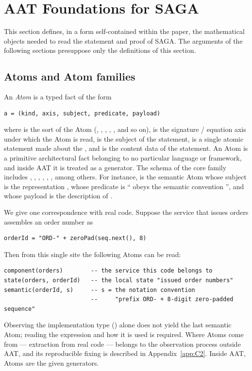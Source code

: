 \section{AAT Foundations for SAGA}\label{sec:3}

This section defines, in a form self-contained within the paper, the
mathematical objects needed to read the statement and proof of SAGA. The
arguments of the following sections presuppose only the definitions of
this section.

\subsection{Atoms and Atom families}\label{sec:31}

\begin{definition}[Atom]\label{def:atom}
An \emph{Atom} is a typed fact of the form
\begin{verbatim}
a = (kind, axis, subject, predicate, payload)
\end{verbatim}
where  is the sort of the Atom (,
, , , , and so
on),  is the signature / equation axis under which the Atom is
read,  is the subject of the statement,  is
a single atomic statement made about the , and
 is the content data of the statement. An Atom is a
primitive architectural fact belonging to no particular language or
framework, and inside AAT it is treated as a generator. The schema of the
core family includes , ,
, , ,
, among others. For instance,
 is the semantic Atom whose subject is the
representation , whose predicate is `` obeys the semantic
convention '', and whose payload is the description of .
\end{definition}

We give one correspondence with real code. Suppose the service that
issues orders assembles an order number as
\begin{verbatim}
orderId = "ORD-" + zeroPad(seq.next(), 8)
\end{verbatim}
Then from this single site the following Atoms can be read:
\begin{verbatim}
component(orders)        -- the service this code belongs to
state(orders, orderId)   -- the local state "issued order numbers"
semantic(orderId, s)     -- s = the notation convention
                         --     "prefix ORD- + 8-digit zero-padded sequence"
\end{verbatim}
Observing the implementation type () alone does not yield
the last semantic Atom; reading the expression and how it is used is
required. Where Atoms come from --- extraction from real code --- belongs
to the observation process outside AAT, and its reproducible fixing is
described in Appendix~\ref{app:C2}. Inside AAT, Atoms are the given generators.

